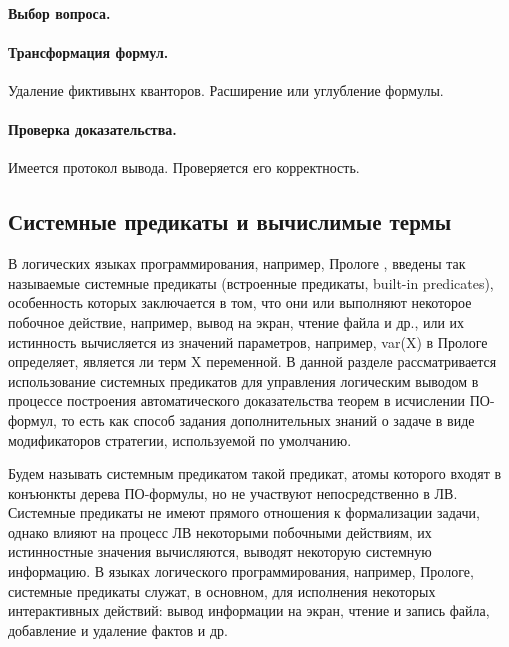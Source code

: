 \paragraph{Выбор вопроса.}

\paragraph{Трансформация формул.} Удаление фиктивынх кванторов. Расширение или углубление формулы.

\paragraph{Проверка доказательства.} Имеется протокол вывода. Проверяется его корректность.

\subsection{Системные предикаты и вычислимые термы}
В логических языках программирования, например, Прологе \cite{Bratko}, введены так называемые системные предикаты (встроенные предикаты, built-in predicates), особенность которых заключается в том, что они или выполняют некоторое побочное действие, например, вывод на экран, чтение файла и др., или их истинность вычисляется из значений параметров, например, var(X) в Прологе определяет, является ли терм X переменной. В данной разделе рассматривается использование системных предикатов для управления логическим выводом в процессе построения автоматического доказательства теорем в исчислении ПО-формул, то есть как способ задания дополнительных знаний о задаче в виде модификаторов стратегии, используемой по умолчанию.

Будем называть системным предикатом такой предикат, атомы которого входят в конъюнкты дерева ПО-формулы, но не участвуют непосредственно в ЛВ. Системные предикаты не имеют прямого отношения к формализации задачи, однако влияют на процесс ЛВ некоторыми побочными действиям, их истинностные значения вычисляются, выводят некоторую системную информацию. В языках логического программирования, например, Прологе, системные предикаты служат, в основном, для исполнения некоторых интерактивных действий: вывод информации на экран, чтение и запись файла, добавление и удаление фактов и др.

